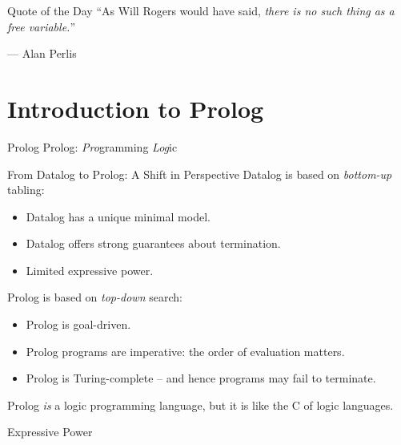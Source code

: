 \begin{frame}{Quote of the Day}
``As Will Rogers would have said, \emph{there is no such thing as a free variable.}''

\begin{flushright}
--- Alan Perlis
\end{flushright}
\end{frame}



\section{Introduction to Prolog}

\begin{frame}{Prolog}
\Large
Prolog: \emph{Pro}gramming \emph{Log}ic
\end{frame}    

\begin{frame}{From Datalog to Prolog: A Shift in Perspective}
Datalog is based on \emph{bottom-up} tabling:

\begin{itemize}
    \item Datalog has a unique minimal model.
    \item Datalog offers strong guarantees about termination.
    \item Limited expressive power.
\end{itemize}

\pause

Prolog is based on \emph{top-down} search:

\begin{itemize}
    \item Prolog is goal-driven.
    \item Prolog programs are imperative: the order of evaluation matters.
    \item Prolog is Turing-complete -- and hence programs may fail to terminate.
\end{itemize}

\pause

Prolog \emph{is} a logic programming language, but it is like the C of logic languages.
\end{frame}

\begin{frame}{Expressive Power}
\centering
\medskip
\medskip
{}
\end{frame}

